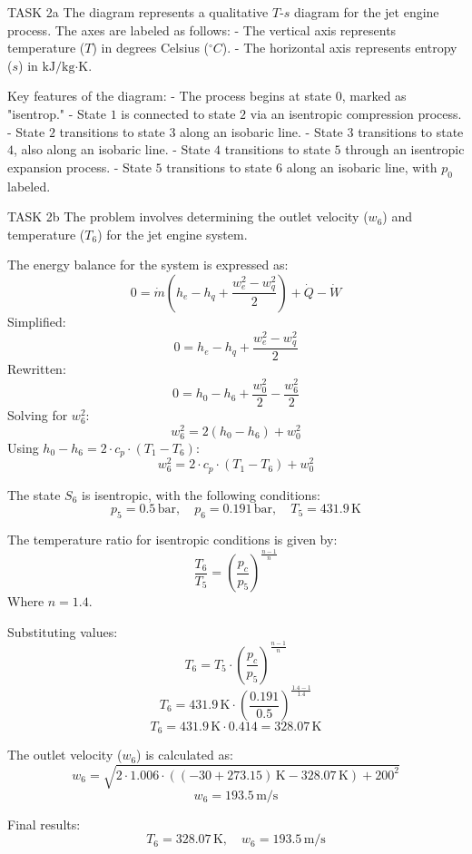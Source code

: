 TASK 2a  
The diagram represents a qualitative \( T \)-\( s \) diagram for the jet engine process. The axes are labeled as follows:  
- The vertical axis represents temperature (\( T \)) in degrees Celsius (\( ^\circ C \)).  
- The horizontal axis represents entropy (\( s \)) in \( \text{kJ}/\text{kg·K} \).  

Key features of the diagram:  
- The process begins at state \( 0 \), marked as "isentrop."  
- State \( 1 \) is connected to state \( 2 \) via an isentropic compression process.  
- State \( 2 \) transitions to state \( 3 \) along an isobaric line.  
- State \( 3 \) transitions to state \( 4 \), also along an isobaric line.  
- State \( 4 \) transitions to state \( 5 \) through an isentropic expansion process.  
- State \( 5 \) transitions to state \( 6 \) along an isobaric line, with \( p_0 \) labeled.  

TASK 2b  
The problem involves determining the outlet velocity (\( w_6 \)) and temperature (\( T_6 \)) for the jet engine system.  

The energy balance for the system is expressed as:  
\[
0 = \dot{m} \left( h_e - h_q + \frac{w_e^2 - w_q^2}{2} \right) + \dot{Q} - \dot{W}
\]  
Simplified:  
\[
0 = h_e - h_q + \frac{w_e^2 - w_q^2}{2}
\]  
Rewritten:  
\[
0 = h_0 - h_6 + \frac{w_0^2}{2} - \frac{w_6^2}{2}
\]  
Solving for \( w_6^2 \):  
\[
w_6^2 = 2 \left( h_0 - h_6 \right) + w_0^2
\]  
Using \( h_0 - h_6 = 2 \cdot c_p \cdot (T_1 - T_6) \):  
\[
w_6^2 = 2 \cdot c_p \cdot (T_1 - T_6) + w_0^2
\]  

The state \( S_6 \) is isentropic, with the following conditions:  
\[
p_5 = 0.5 \, \text{bar}, \quad p_6 = 0.191 \, \text{bar}, \quad T_5 = 431.9 \, \text{K}
\]  

The temperature ratio for isentropic conditions is given by:  
\[
\frac{T_6}{T_5} = \left( \frac{p_c}{p_5} \right)^{\frac{n-1}{n}}
\]  
Where \( n = 1.4 \).  

Substituting values:  
\[
T_6 = T_5 \cdot \left( \frac{p_c}{p_5} \right)^{\frac{n-1}{n}}
\]  
\[
T_6 = 431.9 \, \text{K} \cdot \left( \frac{0.191}{0.5} \right)^{\frac{1.4 - 1}{1.4}}
\]  
\[
T_6 = 431.9 \, \text{K} \cdot 0.414 = 328.07 \, \text{K}
\]  

The outlet velocity (\( w_6 \)) is calculated as:  
\[
w_6 = \sqrt{2 \cdot 1.006 \cdot \left( (-30 + 273.15) \, \text{K} - 328.07 \, \text{K} \right) + 200^2}
\]  
\[
w_6 = 193.5 \, \text{m/s}
\]  

Final results:  
\[
T_6 = 328.07 \, \text{K}, \quad w_6 = 193.5 \, \text{m/s}
\]
